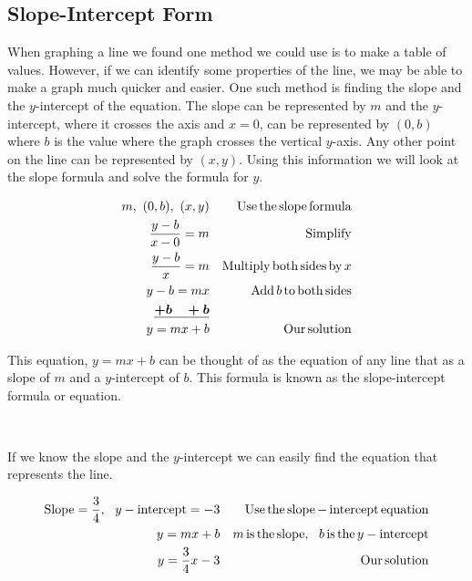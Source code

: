 \subsection{Slope-Intercept Form}\pp

 {}\pp

 When graphing a line we found one method we could use is to make a table of
values. However, if we can identify some properties of the line, we may be
able to make a graph much quicker and easier. One such method is finding the
slope and the $y$-intercept of the equation. The slope can be represented by $m$
and the $y$-intercept, where it crosses the axis and $x = 0$, can be represented
by $(0, b)$ where $b$ is the value where the graph crosses the vertical
$y$-axis. Any other point on the line can be represented by $(x, y)$. Using this
information we will look at the slope formula and solve the formula for $y$.

\begin{example}\label{Lin55}
  \begin{eqnarray*}
    m,~ (0, b),~ (x, y) &  & \operatorname{Use} \operatorname{the} \operatorname{slope} \operatorname{formula}\\
    \frac{y - b}{x - 0} = m &  & \operatorname{Simplify}\\
    \frac{y - b}{x} = m &  & \operatorname{Multiply} \operatorname{both} \operatorname{sides}
    \operatorname{by} x\\
    y - b = m x &  & \operatorname{Add} b \operatorname{to} \operatorname{both} \operatorname{sides}\\
    \boldsymbol{\underline{+ b ~~~+ b}} &  & \\
    y = m x + b &  & \operatorname{Our} \operatorname{solution}
  \end{eqnarray*}
\end{example}

 This equation, $y = m x + b$ can be thought of as the equation of any line
that as a slope of $m$ and a $y$-intercept of $b$. This formula is known as the
slope-intercept formula or equation.\pp

\bbm
 {\tmstrong{\[ \tmop{Slope} - \tmop{intercept~} \tmop{equation} : y = m x + b
\]}}
\ebm

~\par

 If we know the slope and the $y$-intercept we can easily find the equation that
represents the line.

\begin{example}\label{Lin56}
  \begin{eqnarray*}
    \operatorname{Slope} = \frac{3}{4},~~ y - \operatorname{intercept} = - 3 &  & \operatorname{Use}
    \operatorname{the} \operatorname{slope} - \operatorname{intercept} \operatorname{equation}\\
    y = m x + b &  & m \operatorname{is} \operatorname{the} \operatorname{slope},~~ b \operatorname{is}
    \operatorname{the} y - \operatorname{intercept}\\
    y = \frac{3}{4} x - 3 &  & \operatorname{Our} \operatorname{solution}
  \end{eqnarray*}
\end{example}

